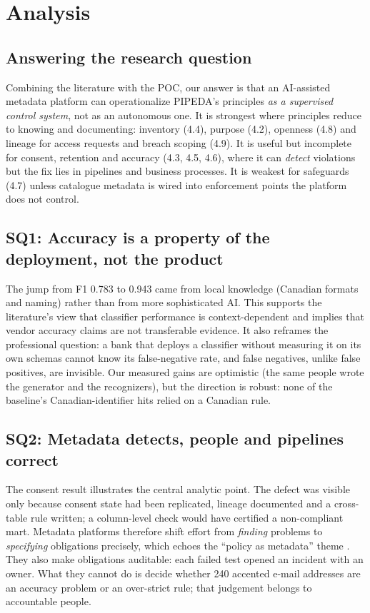 \documentclass[journal,onecolumn,11pt]{IEEEtran}
\begin{document}
\section{Analysis}
\subsection{Answering the research question}
Combining the literature with the POC, our answer is that an AI-assisted metadata platform can operationalize PIPEDA's principles \emph{as a supervised control system}, not as an autonomous one. It is strongest where principles reduce to knowing and documenting: inventory (4.4), purpose (4.2), openness (4.8) and lineage for access requests and breach scoping (4.9). It is useful but incomplete for consent, retention and accuracy (4.3, 4.5, 4.6), where it can \emph{detect} violations but the fix lies in pipelines and business processes. It is weakest for safeguards (4.7) unless catalogue metadata is wired into enforcement points the platform does not control.

\subsection{SQ1: Accuracy is a property of the deployment, not the product}
The jump from F1 0.783 to 0.943 came from local knowledge (Canadian formats and naming) rather than from more sophisticated AI. This supports the literature's view that classifier performance is context-dependent \cite{truong,opc_sensitive} and implies that vendor accuracy claims are not transferable evidence. It also reframes the professional question: a bank that deploys a classifier without measuring it on its own schemas cannot know its false-negative rate, and false negatives, unlike false positives, are invisible. Our measured gains are optimistic (the same people wrote the generator and the recognizers), but the direction is robust: none of the baseline's Canadian-identifier hits relied on a Canadian rule.

\subsection{SQ2: Metadata detects, people and pipelines correct}
The consent result illustrates the central analytic point. The defect was visible only because consent state had been replicated, lineage documented and a cross-table rule written; a column-level check would have certified a non-compliant mart. Metadata platforms therefore shift effort from \emph{finding} problems to \emph{specifying} obligations precisely, which echoes the ``policy as metadata'' theme \cite{jones_contracts,dehghani}. They also make obligations auditable: each failed test opened an incident with an owner. What they cannot do is decide whether 240 accented e-mail addresses are an accuracy problem or an over-strict rule; that judgement belongs to accountable people.
\end{document}
